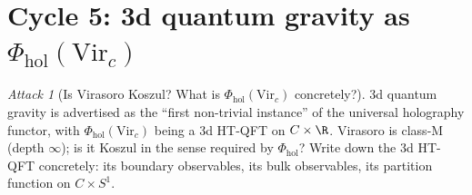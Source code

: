 \documentclass{article}
\theoremstyle{definition}
\theoremstyle{remark}
\newtheorem{attack}[theorem]{Attack}
\newcommand{\Phihol}{\Phi_{\mathrm{hol}}}
\newcommand{\Vir}{\mathrm{Vir}}
\begin{document}
\section{Cycle 5: 3d quantum gravity as $\Phihol(\Vir_c)$}
\label{sec:cycle-5}

\begin{attack}[Is Virasoro Koszul? What is $\Phihol(\Vir_c)$
concretely?]
3d quantum gravity is advertised as the ``first non-trivial
instance'' of the universal holography functor, with
$\Phihol(\Vir_c)$ being a 3d HT-QFT on $C\times\R$. Virasoro is
class-M (depth $\infty$); is it Koszul in the sense required by
$\Phihol$? Write down the 3d HT-QFT concretely: its boundary
observables, its bulk observables, its partition function on
$C\times S^{1}$.
\end{attack}
\end{document}
